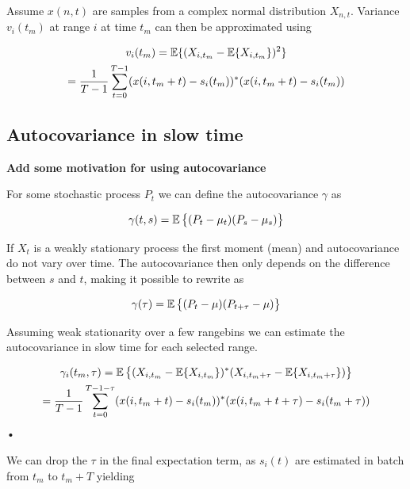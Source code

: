 Assume $x(n,t)$ are samples from a complex normal distribution $X_{n,t}$. Variance $v_i(t_m)$ at range $i$ at time $t_m$ can then be approximated using

\begin{equation}
\label{eq:var}
\begin{gathered}
	v_i(t_m) = \operatorname*{\mathbb{E}}\{ (X_{i,t_m} - \operatorname*{\mathbb{E}}\{X_{i,t_m}\})^2\} \\
	= \frac{1}{T-1}\sum_{t=0}^{T-1}(x(i, t_m + t) - s_i(t_m))^*(x(i, t_m + t) -  s_i(t_m))
\end{gathered}
\end{equation}

\subsection{Autocovariance in slow time}

\textbf{Add some motivation for using autocovariance}

\noindent
For some stochastic process $P_t$ we can define the autocovariance $\gamma$ as

\begin{equation}
	\gamma(t, s) = \operatorname*{\mathbb{E}}\big\{(P_t - \mu_t)(P_s - \mu_s)\big\}
\end{equation}

If $X_t$ is a weakly stationary process the first moment (mean) and autocovariance do not vary over time.  The autocovariance then only depends on the difference between $s$ and $t$, making it possible to rewrite as

\begin{equation}
	\gamma(\tau) = \operatorname*{\mathbb{E}}\big\{(P_t - \mu)(P_{t+\tau} - \mu)\big\}
\end{equation}

Assuming weak stationarity over a few rangebins we can estimate the autocovariance in slow time for each selected range. 

\begin{equation}
\begin{gathered}
	\gamma_i(t_m, \tau) = \operatorname*{\mathbb{E}}\big\{(X_{i,t_m} - \operatorname*{\mathbb{E}}\{X_{i, t_m}\})^*(X_{i, t_m+\tau} - \operatorname*{\mathbb{E}}\{X_{i, t_m+\tau}\})\big\}\\
	= \frac{1}{T-1}\sum_{t=0}^{T-1-\tau}(x(i, t_m + t) - s_i(t_m))^*(x(i, t_m + t + \tau) - s_i(t_m + \tau))
\end{gathered}
\end{equation}•

We can drop the $\tau$ in the final expectation term, as $s_i(t)$ are estimated in batch from $t_m$ to  $t_m + T$ yielding


